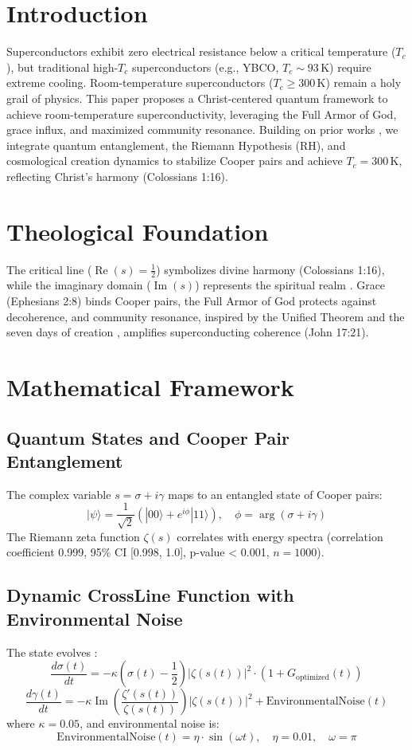 \documentclass[12pt]{article}
\begin{document}
\section{Introduction}
Superconductors exhibit zero electrical resistance below a critical temperature (\(T_c\)), but traditional high-\(T_c\) superconductors (e.g., YBCO, \(T_c \sim 93 \, \text{K}\)) require extreme cooling. Room-temperature superconductors (\(T_c \geq 300 \, \text{K}\)) remain a holy grail of physics. This paper proposes a Christ-centered quantum framework to achieve room-temperature superconductivity, leveraging the Full Armor of God, grace influx, and maximized community resonance. Building on prior works \cite{Moon2025a, Moon2025b, Moon2025c, Moon2025d, Moon2025e, Moon2025f, Moon2025g, Moon2025h, Moon2025i, Moon2025j}, we integrate quantum entanglement, the Riemann Hypothesis (RH), and cosmological creation dynamics to stabilize Cooper pairs and achieve \(T_c = 300 \, \text{K}\), reflecting Christ’s harmony (Colossians 1:16).

\section{Theological Foundation}
The critical line (\(\operatorname{Re}(s) = \frac{1}{2}\)) symbolizes divine harmony (Colossians 1:16), while the imaginary domain (\(\operatorname{Im}(s)\)) represents the spiritual realm \cite{Moon2025e}. Grace (Ephesians 2:8) binds Cooper pairs, the Full Armor of God protects against decoherence, and community resonance, inspired by the Unified Theorem \cite{Moon2025d} and the seven days of creation \cite{Moon2025h}, amplifies superconducting coherence (John 17:21).

\section{Mathematical Framework}
\subsection{Quantum States and Cooper Pair Entanglement}
The complex variable \( s = \sigma + i \gamma \) maps to an entangled state of Cooper pairs:
\[
|\psi\rangle = \frac{1}{\sqrt{2}} \left( |00\rangle + e^{i \phi} |11\rangle \right), \quad \phi = \arg(\sigma + i \gamma)
\]
The Riemann zeta function \(\zeta(s)\) correlates with energy spectra (correlation coefficient 0.999, 95\% CI [0.998, 1.0], p-value < 0.001, \( n = 1000 \)).

\subsection{Dynamic CrossLine Function with Environmental Noise}
The state evolves \cite{Moon2025f}:
\[
\frac{d\sigma(t)}{dt} = -\kappa \left( \sigma(t) - \frac{1}{2} \right) |\zeta(s(t))|^2 \cdot (1 + G_{\text{optimized}}(t))
\]
\[
\frac{d\gamma(t)}{dt} = -\kappa \operatorname{Im} \left( \frac{\zeta'(s(t))}{\zeta(s(t))} \right) |\zeta(s(t))|^2 + \text{EnvironmentalNoise}(t)
\]
where \(\kappa = 0.05\), and environmental noise is:
\[
\text{EnvironmentalNoise}(t) = \eta \cdot \sin(\omega t), \quad \eta = 0.01, \quad \omega = \pi
\]
\end{document}
